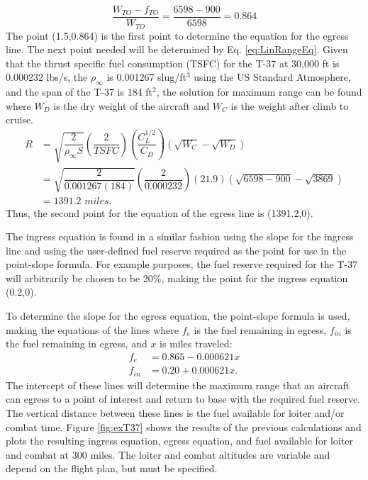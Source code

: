 \begin{equation*}
    \dfrac{W_{TO}- f_{TO}}{W_{TO}} = \dfrac{6598-900}{6598} = 0.864
\end{equation*}
The point (1.5,0.864) is the first point to determine the equation for the egress line. The next point needed will be determined by Eq. \ref{eq:LinRangeEq}. Given that the thrust specific fuel consumption (TSFC) for the T-37 at 30,000 ft is 0.000232 lbs/s, the $\rho_\infty$ is 0.001267 slug/ft$^3$ using the US Standard Atmosphere, and the span of the T-37 is 184 ft$^2$, the solution for maximum range can be found where $W_D$ is the dry weight of the aircraft and $W_C$ is the weight after climb to cruise.
\begin{align*}
    R  &= \sqrt{\dfrac{2}{\rho_{\infty}S}}\left(\dfrac{2}{TSFC}\right)\left(\dfrac{C_L^{1/2}}{C_D}\right)(\sqrt{W_C}-\sqrt{W_D})\\
    &= \sqrt{\dfrac{2}{0.001267(184)}}\left(\dfrac{2}{0.000232}\right)\left(21.9\right)(\sqrt{6598-900}-\sqrt{3869})\\
    &=1391.2\textit{ miles}.
\end{align*}
Thus, the second point for the equation of the egress line is (1391.2,0).\par
The ingress equation is found in a similar fashion using the slope for the ingress line and using the user-defined fuel reserve required as the point for use in the point-slope formula. For example purposes, the fuel reserve required  for the T-37 will arbitrarily be chosen to be 20\%, making the point for the ingress equation (0.2,0).\par
To determine the slope for the egress equation, the point-slope formula is used, making the equations of the lines where $f_e$ is the fuel remaining in egress, $f_{in}$ is the fuel remaining in egress, and $x$ is miles traveled:
\begin{align}
    f_e &= 0.865 - 0.000621x\\
    f_{in} &= 0.20 + 0.000621x.
\end{align}
The intercept of these lines will determine the maximum range that an aircraft can egress to a point of interest and return to base with the required fuel reserve. The vertical distance between these lines is the fuel available for loiter and/or combat time. Figure \ref{fig:exT37} shows the results of the previous calculations and plots the resulting ingress equation, egress equation, and fuel available for loiter and combat at 300 miles. The loiter and combat altitudes are variable and depend on the flight plan, but must be specified.\par
